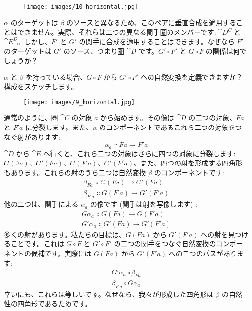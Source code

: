 \begin{figure}[H]
  \centering
  \texttt{[image: images/10\_horizontal.jpg]}
\end{figure}

\noindent
$\alpha$ のターゲットは $\beta$ のソースと異なるため、このペアに垂直合成を適用することはできません。実際、それらは二つの異なる関手圏のメンバーです: $\cat{D^C}$ と $\cat{E^D}$。しかし、$F'$ と $G'$ の関手に合成を適用することはできます。なぜなら $F'$ のターゲットは $G'$ のソース、つまり圏 $\cat{D}$ です。$G' \circ F'$ と $G \circ F$ の関係は何でしょうか？

$\alpha$ と $\beta$ を持っている場合、$G \circ F$ から $G' \circ F'$ への自然変換を定義できますか？構成をスケッチします。

\begin{figure}[H]
  \centering
  \texttt{[image: images/9\_horizontal.jpg]}
\end{figure}

\noindent
通常のように、圏 $\cat{C}$ の対象 $a$ から始めます。その像は $\cat{D}$ の二つの対象、$F a$ と $F'a$ に分裂します。また、$\alpha$ のコンポーネントであるこれら二つの対象をつなぐ射があります: 
\[\alpha_a \Colon F a \to F'a\]
$\cat{D}$ から $\cat{E}$ へ行くと、これら二つの対象はさらに四つの対象に分裂します: $G (F a)$、$G'(F a)$、$G (F'a)$、$G'(F'a)$。また、四つの射を形成する四角形もあります。これらの射のうち二つは自然変換 $\beta$ のコンポーネントです: 
\begin{gather*}
  \beta_{F a} \Colon G (F a) \to G'(F a) \\
  \beta_{F'a} \Colon G (F'a) \to G'(F'a)
\end{gather*}
他の二つは、関手による $\alpha_a$ の像です (関手は射を写像します) : 
\begin{gather*}
  G \alpha_a \Colon G (F a) \to G (F'a) \\
  G'\alpha_a \Colon G'(F a) \to G'(F'a)
\end{gather*}
多くの射があります。私たちの目標は、$G (F a)$ から $G'(F'a)$ への射を見つけることです。これは $G \circ F$ と $G' \circ F'$ の二つの関手をつなぐ自然変換のコンポーネントの候補です。実際には $G (F a)$ から $G'(F'a)$ への二つのパスがあります: 
\begin{gather*}
  G'\alpha_a \circ \beta_{F a} \\
  \beta_{F'a} \circ G \alpha_a
\end{gather*}
幸いにも、これらは等しいです。なぜなら、我々が形成した四角形は $\beta$ の自然性の四角形であるためです。

